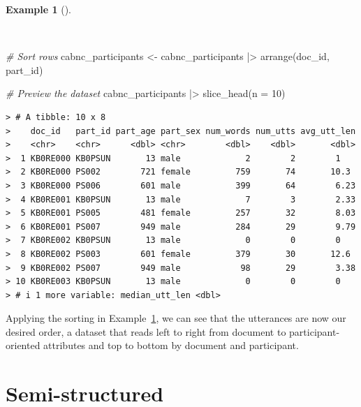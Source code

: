 \documentclass[
  letterpaper,
]{latex/krantz}
\newenvironment{Shaded}{\begin{snugshade}}{\end{snugshade}}
\newcommand{\AttributeTok}[1]{\textcolor[rgb]{0.00,0.00,0.00}{#1}}
\newcommand{\CommentTok}[1]{\textcolor[rgb]{0.00,0.00,0.00}{\textit{#1}}}
\newcommand{\DecValTok}[1]{\textcolor[rgb]{0.00,0.00,0.00}{#1}}
\newcommand{\FunctionTok}[1]{\textcolor[rgb]{0.00,0.00,0.00}{#1}}
\newcommand{\NormalTok}[1]{\textcolor[rgb]{0.00,0.00,0.00}{#1}}
\newcommand{\OtherTok}[1]{\textcolor[rgb]{0.00,0.00,0.00}{#1}}
\newcommand{\SpecialCharTok}[1]{\textcolor[rgb]{0.00,0.00,0.00}{#1}}
\theoremstyle{definition}
\newtheorem{example}{Example}[chapter]
\theoremstyle{remark}
\begin{document}
\begin{example}[]\protect\hypertarget{exm-cd-cabnc-sort-rows}{}\label{exm-cd-cabnc-sort-rows}

~

\begin{Shaded}
\begin{Highlighting}[]
\CommentTok{\# Sort rows}
\NormalTok{cabnc\_participants }\OtherTok{\textless{}{-}}
\NormalTok{  cabnc\_participants }\SpecialCharTok{|\textgreater{}}
  \FunctionTok{arrange}\NormalTok{(doc\_id, part\_id)}

\CommentTok{\# Preview the dataset}
\NormalTok{cabnc\_participants }\SpecialCharTok{|\textgreater{}}
  \FunctionTok{slice\_head}\NormalTok{(}\AttributeTok{n =} \DecValTok{10}\NormalTok{)}
\end{Highlighting}
\end{Shaded}

\begin{verbatim}
> # A tibble: 10 x 8
>    doc_id   part_id part_age part_sex num_words num_utts avg_utt_len
>    <chr>    <chr>      <dbl> <chr>        <dbl>    <dbl>       <dbl>
>  1 KB0RE000 KB0PSUN       13 male             2        2        1   
>  2 KB0RE000 PS002        721 female         759       74       10.3 
>  3 KB0RE000 PS006        601 male           399       64        6.23
>  4 KB0RE001 KB0PSUN       13 male             7        3        2.33
>  5 KB0RE001 PS005        481 female         257       32        8.03
>  6 KB0RE001 PS007        949 male           284       29        9.79
>  7 KB0RE002 KB0PSUN       13 male             0        0        0   
>  8 KB0RE002 PS003        601 female         379       30       12.6 
>  9 KB0RE002 PS007        949 male            98       29        3.38
> 10 KB0RE003 KB0PSUN       13 male             0        0        0   
> # i 1 more variable: median_utt_len <dbl>
\end{verbatim}

\end{example}

Applying the sorting in Example~\ref{exm-cd-cabnc-sort-rows}, we can see
that the utterances are now our desired order, a dataset that reads left
to right from document to participant-oriented attributes and top to
bottom by document and participant.

\section{Semi-structured}\label{semi-structured}
\end{document}
